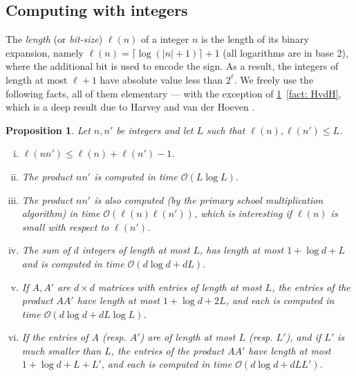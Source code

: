 \documentclass{article}
\def\O{\mathcal{O}}
\theoremstyle{plain}
\newtheorem{proposition}[theorem]{Proposition}
\theoremstyle{definition}
\begin{document}
\subsection{Computing with integers}\label{sec: computing with integers}
%
The \emph{length} (or \emph{bit-size}) $\ell(n)$ of a integer $n$ is the length of its binary expansion, namely $\ell(n) = \lceil\log (|n|+1)\rceil + 1$ (all logarithms are in base 2), where the additional bit is used to encode the sign. As a result, the integers of length at most $\ell + 1$ have absolute value less than $2^\ell$. We freely use the following facts, all of them elementary --- with the exception of \cref{prop: basic facts}~\eqref{fact: HvdH}, which is a deep result due to Harvey and van der Hoeven \cite{harvey2021integer}.

\begin{proposition}\label{prop: basic facts}
%
Let $n,n'$ be integers and let $L$ such that $\ell(n), \ell(n') \le L$.
%
\begin{enumerate}[(i)]
%
\item $\ell(nn') \le \ell(n) + \ell(n') - 1$. 
%
\item\label{fact: HvdH} The product $nn'$ is computed in time $\O(L\log L)$.

\item The product $nn'$ is also computed (by the primary school multiplication algorithm) in time $\O(\ell(n)\ell(n'))$, which is interesting if $\ell(n)$ is small with respect to $\ell(n')$.

\item The sum of $d$ integers of length at most $L$, has length at most $1 + \log d + L$ and is computed in time $\O(d\log d + dL)$.

\item\label{fact: product by general matrix} If $A, A'$ are $d \times d$ matrices with entries of length at most $L$, the entries of the product $AA'$ have length at most $1 + \log d + 2L$, and each is computed in time $\O(d\log d + dL\log L)$.

\item\label{fact: product by fixed matrix} If the entries of $A$ (resp. $A'$) are of length at most $L$ (resp. $L'$), and if $L'$ is much smaller than $L$, the entries of the product $AA'$ have length at most $1 + \log d + L + L'$, and each is computed in time $\O(d\log d + dLL')$.
%
\end{enumerate}
%
\end{proposition}
\end{document}
